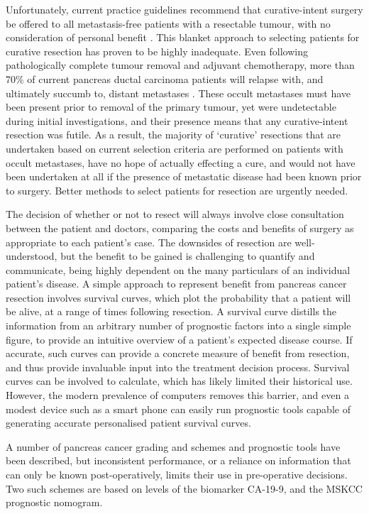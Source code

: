 \documentclass[dissertation.tex]{subfiles}
\begin{document}
Unfortunately, current practice guidelines recommend that curative-intent surgery be offered to all metastasis-free patients with a resectable tumour, with no consideration of personal benefit \cite{Editors2015}.  This blanket approach to selecting patients for curative resection has proven to be highly inadequate.  Even following pathologically complete tumour removal and adjuvant chemotherapy, more than 70\% of current pancreas ductal carcinoma patients will relapse with, and ultimately succumb to, distant metastases \cite{Barugola2007}.  These occult metastases must have been present prior to removal of the primary tumour, yet were undetectable during initial investigations, and their presence means that any curative-intent resection was futile.  As a result, the majority of `curative' resections that are undertaken based on current selection criteria are performed on patients with occult metastases, have no hope of actually effecting a cure, and would not have been undertaken at all if the presence of metastatic disease had been known prior to surgery.  Better methods to select patients for resection are urgently needed.

The decision of whether or not to resect will always involve close consultation between the patient and doctors, comparing the costs and benefits of surgery as appropriate to each patient's case.  The downsides of resection are well-understood, but the benefit to be gained is challenging to quantify and communicate, being highly dependent on the many particulars of an individual patient's disease.  A simple approach to represent benefit from pancreas cancer resection involves survival curves, which plot the probability that a patient will be alive, at a range of times following resection.  A survival curve distills the information from an arbitrary number of prognostic factors into a single simple figure, to provide an intuitive overview of a patient's expected disease course.  If accurate, such curves can provide a concrete measure of benefit from resection, and thus provide invaluable input into the treatment decision process.  Survival curves can be involved to calculate, which has likely limited their historical use.  However, the modern prevalence of computers removes this barrier, and even a modest device such as a smart phone can easily run prognostic tools capable of generating accurate personalised patient survival curves.

A number of pancreas cancer grading and schemes and prognostic tools have been described, but inconsistent performance, or a reliance on information that can only be known post-operatively, limits their use in pre-operative decisions.  Two such schemes are based on levels of the biomarker \gls{CA-19-9}, and the \gls{MSKCC} prognostic nomogram.
\end{document}
